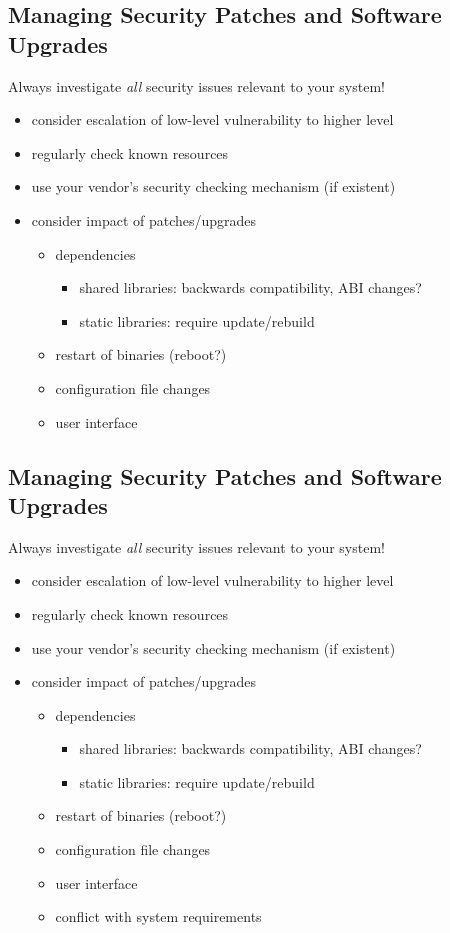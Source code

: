 \documentclass[xga]{xdvislides}
\begin{document}
\subsection{Managing Security Patches and Software Upgrades}
Always investigate {\em all} security issues relevant to your system!
\begin{itemize}
	\item consider escalation of low-level vulnerability to higher level
	\item regularly check known resources
	\item use your vendor's security checking mechanism (if existent)
	\item consider impact of patches/upgrades
		\begin{itemize}
			\item dependencies
				\begin{itemize}
					\item shared libraries:  backwards compatibility, ABI
						changes?
					\item static libraries:  require update/rebuild
				\end{itemize}
			\item restart of binaries (reboot?)
			\item configuration file changes
			\item user interface
		\end{itemize}
\end{itemize}

\subsection{Managing Security Patches and Software Upgrades}
Always investigate {\em all} security issues relevant to your system!
\begin{itemize}
	\item consider escalation of low-level vulnerability to higher level
	\item regularly check known resources
	\item use your vendor's security checking mechanism (if existent)
	\item consider impact of patches/upgrades
		\begin{itemize}
			\item dependencies
				\begin{itemize}
					\item shared libraries:  backwards compatibility, ABI
						changes?
					\item static libraries:  require update/rebuild
				\end{itemize}
			\item restart of binaries (reboot?)
			\item configuration file changes
			\item user interface
			\item conflict with system requirements
		\end{itemize}
\end{itemize}
\end{document}
